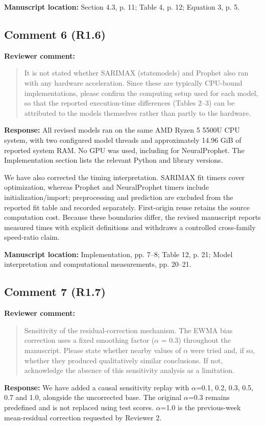 \documentclass[11pt,a4paper]{article}
\begin{document}
\textbf{Manuscript location:} Section 4.3, p. 11; Table 4, p. 12; Equation 3, p. 5.
\begin{samepage}
\subsection*{Comment 6 (R1.6)}
\textbf{Reviewer comment:}
\begin{quote}\small It is not stated whether SARIMAX (statsmodels) and Prophet also ran with any hardware acceleration. Since these are typically CPU-bound implementations, please confirm the computing setup used for each model, so that the reported execution-time differences (Tables 2--3) can be attributed to the models themselves rather than partly to the hardware.\end{quote}
\end{samepage}
\textbf{Response:}
All revised models ran on the same AMD Ryzen 5 5500U CPU system, with two configured model threads and approximately 14.96 GiB of reported system RAM. No GPU was used, including for NeuralProphet. The Implementation section lists the relevant Python and library versions.

We have also corrected the timing interpretation. SARIMAX fit timers cover optimization, whereas Prophet and NeuralProphet timers include initialization/import; preprocessing and prediction are excluded from the reported fit table and recorded separately. First-origin reuse retains the source computation cost. Because these boundaries differ, the revised manuscript reports measured times with explicit definitions and withdraws a controlled cross-family speed-ratio claim.

\textbf{Manuscript location:} Implementation, pp. 7--8; Table 12, p. 21; Model interpretation and computational measurements, pp. 20--21.
\begin{samepage}
\subsection*{Comment 7 (R1.7)}
\textbf{Reviewer comment:}
\begin{quote}\small Sensitivity of the residual-correction mechanism. The EWMA bias correction uses a fixed smoothing factor ($\alpha$ = 0.3) throughout the manuscript. Please state whether nearby values of $\alpha$ were tried and, if so, whether they produced qualitatively similar conclusions. If not, acknowledge the absence of this sensitivity analysis as a limitation.\end{quote}
\end{samepage}
\textbf{Response:}
We have added a causal sensitivity replay with $\alpha$=0.1, 0.2, 0.3, 0.5, 0.7 and 1.0, alongside the uncorrected base. The original $\alpha$=0.3 remains predefined and is not replaced using test scores. $\alpha$=1.0 is the previous-week mean-residual correction requested by Reviewer 2.
\end{document}
